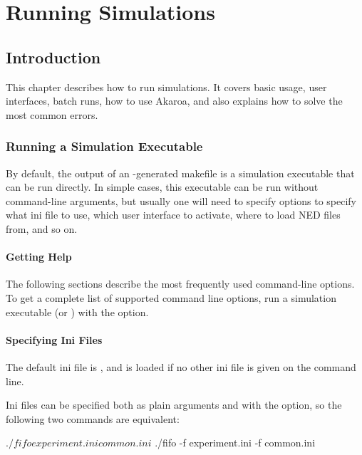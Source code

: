 \chapter{Running Simulations}
\label{cha:run-sim}

\section{Introduction}

This chapter describes how to run simulations. It covers basic usage,
user interfaces, batch runs, how to use Akaroa, and also explains
how to solve the most common errors.

\subsection{Running a Simulation Executable}
\label{sec:ch-run-sim:running}

By default, the output of an -generated makefile is
a simulation executable that can be run directly. In simple cases,
this executable can be run without command-line arguments, but usually
one will need to specify options to specify what ini file to use,
which user interface to activate, where to load NED files from, and so on.

\subsubsection{Getting Help}

The following sections describe the most frequently used command-line
options. To get a complete list of supported command line options, run
a simulation executable (or ) with the  option.


\subsubsection{Specifying Ini Files}

The default ini file is , and is
loaded if no other ini file is given on the command line.

Ini files can be specified both as plain arguments and with the 
option, so the following two commands are equivalent:

\begin{commandline}
$ ./fifo experiment.ini common.ini
$ ./fifo -f experiment.ini -f common.ini
\end{commandline}

